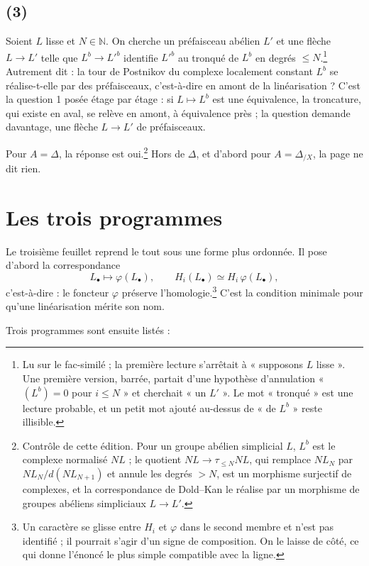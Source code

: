 \documentclass[11pt,a4paper]{article}
\begin{document}
\subsection*{(3)}

Soient $L$ lisse et $N \in \mathbb{N}$. On cherche un préfaisceau abélien $L'$
et une flèche $L \to L'$ telle que $L^{b} \to L'^{b}$ identifie $L'^{b}$ au
tronqué de $L^{b}$ en degrés $\leq N$.\footnote{Lu sur le fac-similé ; la
première lecture s'arrêtait à « supposons $L$ lisse ». Une première version,
barrée, partait d'une hypothèse d'annulation « $(L^{b}) = 0$ pour $i \leq N$ »
et cherchait « un $L'$ ». Le mot « tronqué » est une lecture probable, et un
petit mot ajouté au-dessus de « de $L^{b}$ » reste illisible.} Autrement dit :
la tour de Postnikov du complexe localement constant $L^{b}$ se
réalise-t-elle par des préfaisceaux, c'est-à-dire en amont de la
linéarisation ? C'est la question 1 posée étage par étage : si $L \mapsto L^{b}$
est une équivalence, la troncature, qui existe en aval, se relève en amont, à équivalence près ; la question demande davantage, une flèche $L \to L'$ de préfaisceaux.

Pour $A = \Delta$, la réponse est oui.\footnote{Contrôle de cette édition. Pour
un groupe abélien simplicial $L$, $L^{b}$ est le complexe normalisé $NL$ ;
le quotient $NL \to \tau_{\leq N} NL$, qui remplace $NL_{N}$ par
$NL_{N}/d(NL_{N+1})$ et annule les degrés $> N$, est un morphisme surjectif de
complexes, et la correspondance de Dold--Kan le réalise par un morphisme de
groupes abéliens simpliciaux $L \to L'$.} Hors de $\Delta$, et d'abord pour
$A = \Delta_{/X}$, la page ne dit rien.

\section*{Les trois programmes}

Le troisième feuillet reprend le tout sous une forme plus ordonnée. Il pose
d'abord la correspondance
\[
L_{\bullet} \longmapsto \varphi(L_{\bullet}),
\qquad
H_{i}(L_{\bullet}) \simeq H_{i}\,\varphi(L_{\bullet}),
\]
c'est-à-dire : le foncteur $\varphi$ préserve l'homologie.\footnote{Un
caractère se glisse entre $H_{i}$ et $\varphi$ dans le second membre et n'est
pas identifié ; il pourrait s'agir d'un signe de composition. On le laisse de
côté, ce qui donne l'énoncé le plus simple compatible avec la ligne.} C'est la
condition minimale pour qu'une linéarisation mérite son nom.

Trois programmes sont ensuite listés :
\end{document}
